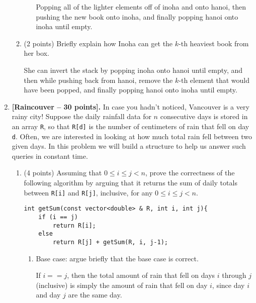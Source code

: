 \documentclass[11pt]{article}
\def\problem#1{\def\problemheading{#1}\clearpage\item{\bf #1.}}
\begin{document}
\begin{enumerate}
\begin{enumerate}
\begin{itemize}
\begin{framed} 
Popping all of the lighter elements off of inoha and onto hanoi, then pushing the new book onto inoha, and finally popping hanoi onto inoha until empty.
\end{framed}

\end{itemize}

\item (2 points) Briefly explain how Inoha can get the $k$-th heaviest book from her box.
\begin{framed}
She can invert the stack by popping inoha onto hanoi until empty, and then while pushing back from hanoi, remove the $k$-th element that would have been popped, and finally popping hanoi onto inoha until empty.
\end{framed}
\end{enumerate}
\newpage

\problem{[Raincouver -- 30 points]}
In case you hadn't noticed, Vancouver is a very rainy city! Suppose the daily rainfall data for $n$ consecutive days is stored in an array {\tt R}, so that {\tt R[d]} is the number of centimeters of rain that fell on day {\tt d}. Often, we are interested in looking at how much total rain fell between two given days. In this problem we will build a structure to help us answer such queries in constant time. 
\begin{enumerate}

\item (4 points) Assuming that $0 \leq i \leq j< n$, prove the correctness of the following algorithm by arguing that it returns the sum of daily totals between {\tt R[i]} and {\tt R[j]}, inclusive, for any $0 \leq i \leq j< n$.

\begin{lstlisting}
int getSum(const vector<double> & R, int i, int j){
	if (i == j)
		return R[i];
	else
		return R[j] + getSum(R, i, j-1);
\end{lstlisting}
\begin{enumerate}
	\item Base case: argue briefly that the base case is correct.\\ 
\begin{framed}
    If $i == j$, then the total amount of rain that fell on days $i$ through $j$  (inclusive) is simply the amount of rain that fell on day $i$, since day $i$ and day $j$ are the same day.
\end{framed}
    

\end{enumerate}
\end{enumerate}
\end{enumerate}
\end{document}
